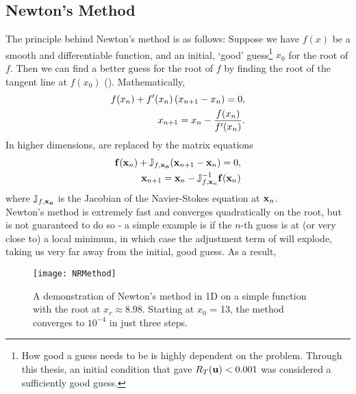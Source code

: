 \subsection{Newton's Method}
The principle behind Newton's method is as follows: Suppose we have $f(x)$ be a smooth and differentiable function, and an initial, `good' guess\footnote{How good a guess needs to be is highly dependent on the problem. Through this thesis, an initial condition that gave $R_T(\mathbf{u}) < 0.001$ was considered a sufficiently good guess.}  $x_0$ for the root of $f$. Then we can find a better guess for the root of $f$ by finding the root of the tangent line at $f(x_0)$ (). Mathematically, 
\begin{align}
f(x_n) + f'(x_n)\left ( x_{n+1} - x_n \right ) = 0,\label{eq:NRS1D}\\ 
x_{n+1} = x_n - \dfrac{f(x_n)}{f'(x_n)}.\label{eq:NR1D}
\end{align}
In higher dimensions,  are replaced by the matrix equations
\begin{align}
\mathbf{f}(\mathbf{x}_n) + \mathbb{J}_{f,\mathbf{x_n}}(\mathbf{x}_{n+1} - \mathbf{x}_n) = 0,\label{eq:NRSND}\\
\mathbf{x}_{n+1} = \mathbf{x}_n - \mathbb{J}_{f,\mathbf{x}_n}^{-1}\mathbf{f}(\mathbf{x}_n)
\end{align}
where $\mathbb{J}_{f,\mathbf{x_n}}$ is the Jacobian of the Navier-Stokes equation at $\mathbf{x}_n$.\\
 
Newton's method is extremely fast and converges quadratically on the root, but is not guaranteed to do so - a simple example is if the $n$-th guess is at (or very close to) a local minimum, in which case the adjustment term of  will explode, taking us very far away from the initial, good guess. As a result, 
\begin{figure}[h]
\texttt{[image: NRMethod]}
\caption{A demonstration of Newton's method in 1D on a simple function with the root at $x_r \approx 8.98$. Starting at $x_0$ = 13, the method converges to $10^{-4}$ in just three steps.}\label{fig:Newton}
\end{figure}  


